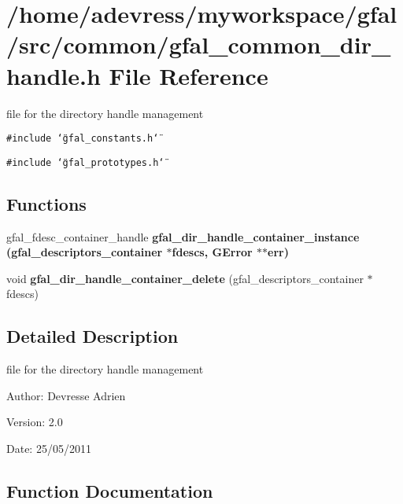 \section{/home/adevress/myworkspace/gfal/src/common/gfal\_\-common\_\-dir\_\-handle.h File Reference}
\label{gfal__common__dir__handle_8h}
file for the directory handle management 

{\tt \#include \char`\"{}gfal\_\-constants.h\char`\"{}}\par
{\tt \#include \char`\"{}gfal\_\-prototypes.h\char`\"{}}\par
\subsection*{Functions}
\begin{CompactItemize}
\item 
gfal\_\-fdesc\_\-container\_\-handle \bf{gfal\_\-dir\_\-handle\_\-container\_\-instance} (gfal\_\-descriptors\_\-container $\ast$fdescs, GError $\ast$$\ast$err)
\item 
void \textbf{gfal\_\-dir\_\-handle\_\-container\_\-delete} (gfal\_\-descriptors\_\-container $\ast$fdescs)\label{gfal__common__dir__handle_8h_266f240b644154dade8bdb39e4c20efc}

\end{CompactItemize}


\subsection{Detailed Description}
file for the directory handle management 

\begin{Desc}
\item[Author:]Devresse Adrien \end{Desc}
\begin{Desc}
\item[Version:]2.0 \end{Desc}
\begin{Desc}
\item[Date:]25/05/2011 \end{Desc}


\subsection{Function Documentation}
